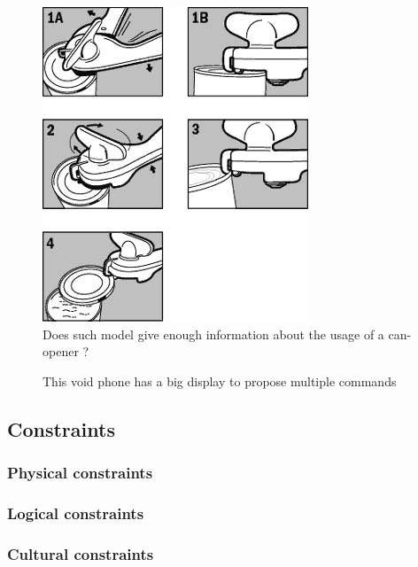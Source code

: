 \documentclass[a4paper,11pt] {article}
\theoremstyle{definition}
\begin{document}
 \begin{minipage}{\linewidth}
      \centering
      \begin{minipage}{0.45\linewidth}
          \begin{figure}[H]
          \centering
              \includegraphics[scale=0.4]{can-opener}
              \caption{Does such model give enough information about the usage of a can-opener ?}
          \end{figure}
      \end{minipage}
      \hspace{0.05\linewidth}
      \begin{minipage}{0.45\linewidth}
          \begin{figure}[H]
                    \centering
              \caption{This void phone has a big display to propose multiple commands}
          \end{figure}
      \end{minipage}
  \end{minipage}

\subsection{Constraints}


\subsubsection{Physical constraints}
\subsubsection{Logical constraints}
\subsubsection{Cultural constraints}
\end{document}
